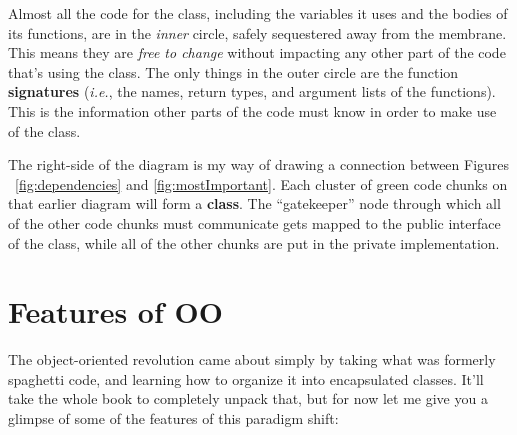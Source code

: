 Almost all the code for the class, including the variables it uses and the
bodies of its functions, are in the \textit{inner} circle, safely sequestered
away from the membrane. This means they are \textit{free to change} without
impacting any other part of the code that's using the class. The only things
in the outer circle are the function \textbf{signatures} (\textit{i.e.}, the
names, return types, and argument lists of the functions). This is the
information other parts of the code must know in order to make use of the
class.

The right-side of the diagram is my way of drawing a connection between
Figures ~\ref{fig:dependencies} and \ref{fig:mostImportant}. Each cluster of
green code chunks on that earlier diagram will form a \textbf{class}. The
``gatekeeper'' node through which all of the other code chunks must
communicate gets mapped to the public interface of the class, while all of the
other chunks are put in the private implementation.

\section{Features of OO}

The object-oriented revolution came about simply by taking what was formerly
spaghetti code, and learning how to organize it into encapsulated classes.
It'll take the whole book to completely unpack that, but for now let me give
you a glimpse of some of the features of this paradigm shift:

